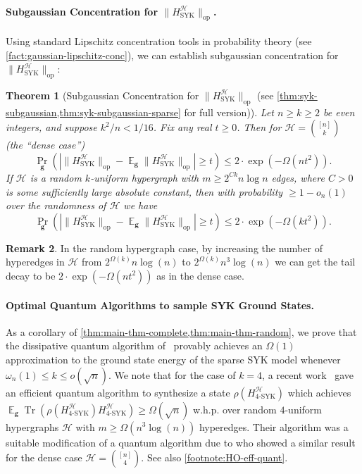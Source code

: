 \documentclass
[11pt,letterpaper]
{article}
\newtheorem{theorem}{Theorem}[section]
\theoremstyle{definition}
\newtheorem{remark}[theorem]{Remark}
\newcommand{\op}{\operatorname{op}}
\newcommand{\Tr}{\operatorname{Tr}}
\newcommand{\1}{\mathbf{1}}
\newcommand{\cH}{\mathcal H}
\DeclareMathOperator*{\E}{\mathbb{E}}
\renewcommand{\geq}{\geqslant}
\renewcommand{\leq}{\leqslant}
\newcommand{\syk}{\operatorname{SYK}}
\begin{document}
\paragraph{Subgaussian Concentration for $\|H^\cH_{\syk}\|_{\op}$.} Using standard Lipschitz concentration tools in probability theory (see \cref{fact:gaussian-lipschitz-conc}), we can establish subgaussian concentration for $\|H^\cH_{\syk}\|_{\op}$:

\begin{theorem}[Subgaussian Concentration for $\|H^\cH_{\syk}\|_{\op}$ (see \cref{thm:syk-subgaussian,thm:syk-subgaussian-sparse} for full version)]\label{thm:main-thm-subgaussian}
    Let $n\geq k\geq 2$ be even integers, and suppose $k^2/n < 1/16$. Fix any real $t\geq 0$. Then for $\cH = \binom{[n]}{k}$ (the ``dense case'')
    \[\Pr_{\bm g}\left(\left|\|H^\cH_{\syk}\|_{\operatorname{op}} - \E_{\bm g}\|H^\cH_{\syk}\|_{\operatorname{op}}\right|\geq t\right)\leq 2\cdot\exp\left(-\Omega(nt^2)\right).\]
    If $\cH$ is a random $k$-uniform hypergraph with $m\geq 2^{Ck}n\log n$ edges, where $C > 0$ is some sufficiently large absolute constant, then with probability $\geq 1 - o_n(1)$ over the randomness of $\cH$ we have
    \[\Pr_{\bm g}\left(\left|\|H^\cH_{\syk}\|_{\operatorname{op}} - \E_{\bm g}\|H^\cH_{\syk}\|_{\operatorname{op}}\right|\geq t\right)\leq 2\cdot\exp\left(-\Omega(kt^2)\right).\]
\end{theorem}
\begin{remark}
    In the random hypergraph case, by increasing the number of hyperedges in $\cH$ from $2^{\Omega(k)}n\log(n)$ to $2^{\Omega(k)}n^3\log(n)$ we can get the tail decay to be $2\cdot\exp\left(-\Omega(nt^2)\right)$ as in the dense case.
\end{remark}

\paragraph{Optimal Quantum Algorithms to sample SYK Ground States.} As a corollary of \cref{thm:main-thm-complete,thm:main-thm-random}, we prove that the dissipative quantum algorithm of~\cite{basso2024optimizing} provably achieves an $\Omega(1)$ approximation to the ground state energy of the sparse SYK model whenever $\omega_n(1)\leq k\leq o(\sqrt{n})$. We note that for the case of $k=4$, a recent work~\cite{dingOptimizingSparseSYK2026} gave an efficient quantum algorithm to synthesize a state $\rho(H^\cH_{\operatorname{4-SYK}})$ which achieves $\E_{\bm g}\Tr(\rho(H^\cH_{\operatorname{4-SYK}})H^\cH_{\operatorname{4-SYK}})\geq\Omega(\sqrt{n})$ w.h.p. over random $4$-uniform hypergraphs $\cH$ with $m\geq\Omega(n^3\log(n))$ hyperedges. Their algorithm was a suitable modification of a quantum algorithm due to \cite{hastings2022optimizing} who showed a similar result for the dense case $\cH = \binom{[n]}{4}$. See also \cref{footnote:HO-eff-quant}.
\end{document}

